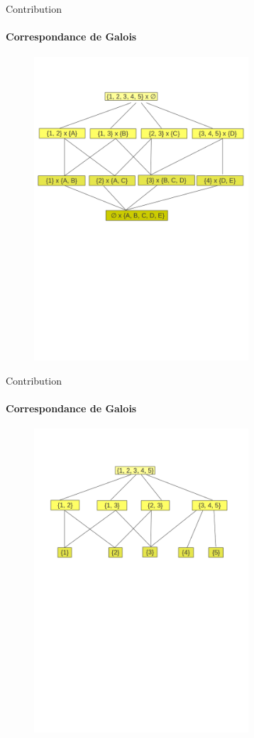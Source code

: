 \documentclass{beamer}
\begin{document}
  \begin{frame}{Contribution}
  \framesubtitle{Correspondance de Galois}
   \begin{figure}
	\includegraphics[width=8cm]{images/treillis.png} 
    \end{figure}
  \end{frame}

  \begin{frame}{Contribution}
  \framesubtitle{Correspondance de Galois}
   \begin{figure}
	\includegraphics[width=8cm]{images/treillismoins.png} 
    \end{figure}
  \end{frame}
\end{document}

